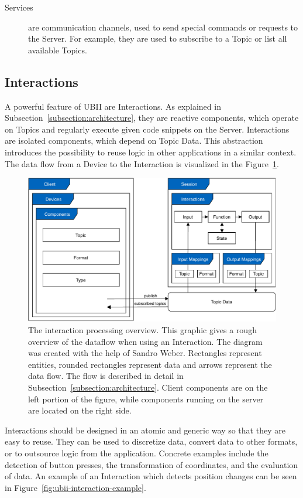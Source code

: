 \begin{description}
	\item[Services] are communication channels, used to send special commands or requests to the Server. For example, they are used to subscribe to a Topic or list all available Topics.
\end{description}


\subsection{Interactions}\label{subsection:interactions}
A powerful feature of \gls{UBII} are Interactions. As explained in Subsection~\ref{subsection:architecture}, they are reactive components, which operate on Topics and regularly execute given code snippets on the Server. Interactions are isolated components, which depend on Topic Data. This abstraction introduces the possibility to reuse logic in other applications in a similar context. The data flow from a Device to the Interaction is visualized in the Figure~\ref{fig:ubii-cd}.

\begin{figure}[H]
	\centering
	\includegraphics[width=12cm]{figures/implementation/ubii_cd.pdf}
	\caption[UBII communication diagram]{The interaction processing overview. This graphic gives a rough overview of the dataflow when using an Interaction. The diagram was created with the help of Sandro Weber. Rectangles represent entities, rounded rectangles represent data and arrows represent the data flow. The flow is described in detail in Subsection~\ref{subsection:architecture}. Client components are on the left portion of the figure, while components running on the server are located on the right side.}\label{fig:ubii-cd}
\end{figure}

Interactions should be designed in an atomic and generic way so that they are easy to reuse. They can be used to discretize data, convert data to other formats, or to outsource logic from the application. Concrete examples include the detection of button presses, the transformation of coordinates, and the evaluation of data. An example of an Interaction which detects position changes can be seen in Figure~\ref{fig:ubii-interaction-example}.

